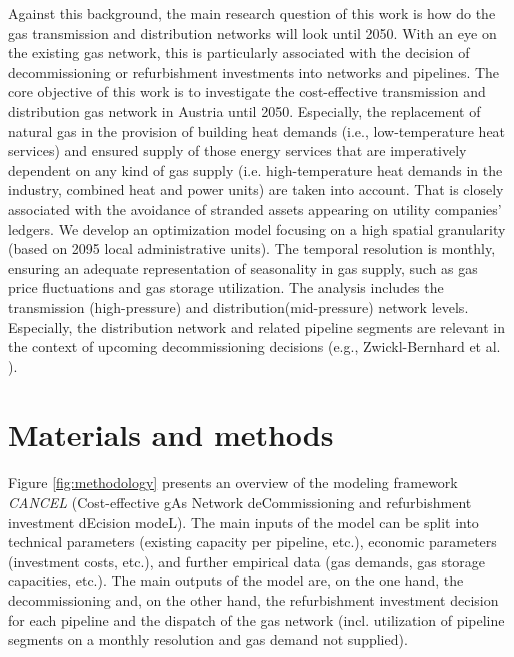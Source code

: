 \documentclass[review]{elsarticle}
\begin{document}
Against this background, the main research question of this work is how do the gas transmission and distribution networks will look until 2050. With an eye on the existing gas network, this is particularly associated with the decision of decommissioning or refurbishment investments into networks and pipelines. The core objective of this work is to investigate the cost-effective transmission and distribution gas network in Austria until 2050. Especially, the replacement of natural gas in the provision of building heat demands (i.e., low-temperature heat services) and ensured supply of those energy services that are imperatively dependent on any kind of gas supply (i.e. high-temperature heat demands in the industry, combined heat and power units) are taken into account. That is closely associated with the avoidance of stranded assets appearing on utility companies’ ledgers. We develop an optimization model focusing on a high spatial granularity (based on 2095 local administrative units). The temporal resolution is monthly, ensuring an adequate representation of seasonality in gas supply, such as gas price fluctuations and gas storage utilization. The analysis includes the transmission (high-pressure) and distribution(mid-pressure) network levels. Especially, the distribution network and related pipeline segments are relevant in the context of upcoming decommissioning decisions (e.g., Zwickl-Bernhard et al. \cite{zwickl2021demystifying}).

\section{Materials and methods}
Figure \ref{fig:methodology} presents an overview of the modeling framework \textit{CANCEL} (Cost-effective gAs Network deCommissioning and refurbishment investment dEcision modeL). The main inputs of the model can be split into technical parameters (existing capacity per pipeline, etc.), economic parameters (investment costs, etc.), and further empirical data (gas demands, gas storage capacities, etc.). The main outputs of the model are, on the one hand, the decommissioning and, on the other hand, the refurbishment investment decision for each pipeline and the dispatch of the gas network (incl. utilization of pipeline segments on a monthly resolution and gas demand not supplied).\vspace{0.3cm}  
\end{document}
